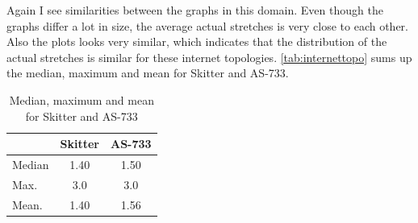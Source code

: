 Again I see similarities between the graphs in this domain.
Even though the graphs differ a lot in size, the average actual stretches is
very close to each other. Also the plots looks very similar, which indicates that
the distribution of the actual stretches is similar for these internet topologies.
\autoref{tab:internettopo} sums up the median, maximum and mean for Skitter
and AS-733.

\begin{table}[htbp]
    \centering
    \begin{tabular}{ l | c | c }
        \toprule
             & Skitter & AS-733 \\
        \midrule
        Median & 1.40 & 1.50 \\
        Max. & 3.0 & 3.0 \\
        \midrule
        Mean. & 1.40 & 1.56 \\
    \end{tabular}
    \caption{Median, maximum and mean for Skitter and AS-733}
    \label{tab:internettopo}
\end{table}
